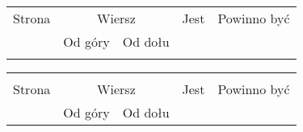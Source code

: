 \documentclass[a4paper,11pt]{article}
\begin{document}


















\begin{center}

  \begin{tabular}{|c|c|c|c|c|}
    \hline
    Strona & \multicolumn{2}{c|}{Wiersz} & Jest
                              & Powinno być \\ \cline{2-3}
    & Od góry & Od dołu & & \\
    \hline
           & & & & \\
    \hline
  \end{tabular}





  \begin{tabular}{|c|c|c|c|c|}
    \hline
    & \multicolumn{2}{c|}{} & & \\
    Strona & \multicolumn{2}{c|}{Wiersz} & Jest
                              & Powinno być \\ \cline{2-3}
    & Od góry & Od dołu & & \\
    \hline
    \hline
  \end{tabular}

\end{center}
\end{document}
